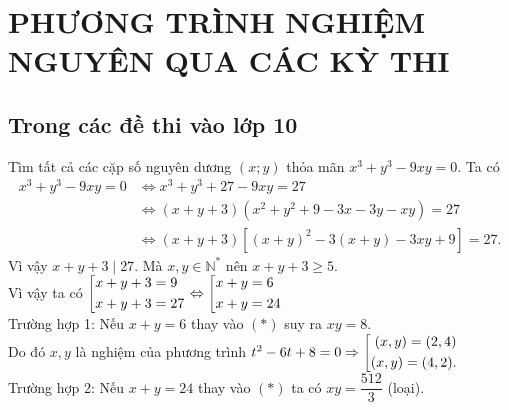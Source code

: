 \chapter{PHƯƠNG TRÌNH NGHIỆM NGUYÊN QUA CÁC KỲ THI}
\section{Trong các đề thi vào lớp 10}
\begin{bt}%
	Tìm tất cả các cặp số nguyên dương $(x;y)$ thỏa mãn $x^3+y^3-9xy=0$.
	\loigiai
	{Ta có 
		{\allowdisplaybreaks
		\begin{align*}
		x^3+y^3-9xy=0 &\Leftrightarrow x^3+y^3+27-9xy=27\\ &\Leftrightarrow (x+y+3)(x^2+y^2+9-3x-3y-xy)=27 
		\\ & \Leftrightarrow (x+y+3)\left[ (x+y)^2-3(x+y) -3xy+9 \right]=27.\tag{*}
		\end{align*}}Vì vậy $x+y+3 \mid 27$. Mà $x,y \in \mathbb{N}^*$ nên $x+y+3 \geq 5$.
		\\ Vì vậy ta có $\left[\begin{aligned}x+y+3&=9 \\ x+y+3&=27\end{aligned}\right. \Leftrightarrow \left[\begin{aligned}x+y&=6 \\ x+y&=24\end{aligned}\right.$
		\\Trường hợp 1: Nếu $x+y=6$ thay vào $(*)$ suy ra $xy=8$.
		\\ Do đó $x,y$ là nghiệm của phương trình $t^2-6t+8=0 \Rightarrow \left[\begin{aligned}(x,y)=(2,4) \\ (x,y)=(4,2).\end{aligned}\right.$
		\\ Trường hợp 2: Nếu $x+y=24$ thay vào $(*)$ ta có $xy=\dfrac{512}{3}$ (loại).
	}
\end{bt}

